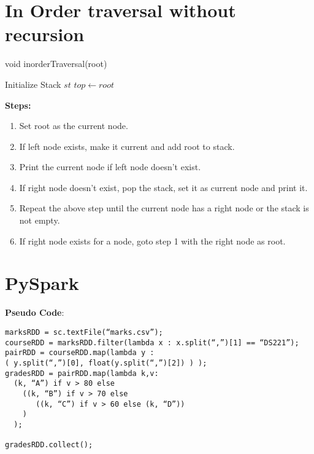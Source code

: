 \documentclass{article}
\begin{document}
\pagebreak
\section{In Order traversal without recursion}
\label{sec:7}

\begin{algorithm}
  \caption{void inorderTraversal(root)}\label{alg:7}
  \DontPrintSemicolon
  Initialize Stack $st$\;
  $top \gets root$\;
\end{algorithm}
\textbf{Steps:}
\begin{enumerate}
\item Set root as the current node.
\item If left node exists, make it current and add root to stack.
\item Print the current node if left node doesn't exist.
\item If right node doesn't exist, pop the stack, set it as current node and print it.
\item Repeat the above step until the current node has a right node or the stack is not empty.
\item If right node exists for a node, goto step 1 with the right node as root.
\end{enumerate}

\pagebreak
\section{PySpark}
\label{sec:8}

\textbf{Pseudo Code}:
\begin{verbatim}
marksRDD = sc.textFile(“marks.csv”); 
courseRDD = marksRDD.filter(lambda x : x.split(“,”)[1] == “DS221”); 
pairRDD = courseRDD.map(lambda y :  
( y.split(“,”)[0], float(y.split(“,”)[2]) ) ); 
gradesRDD = pairRDD.map(lambda k,v:  
  (k, “A”) if v > 80 else  
    ((k, “B”) if v > 70 else  
       ((k, “C”) if v > 60 else (k, “D”)) 
    ) 
  ); 
 
gradesRDD.collect(); 
\end{verbatim}
\end{document}
